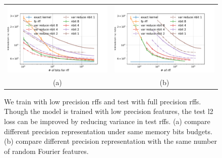 \begin{figure}
	\centering
	\begin{tabular}{c c}
		\includegraphics[width=.45\linewidth]{figures/valid_l2_var_reduction.pdf} &
		\includegraphics[width=.45\linewidth]{figures/valid_l2_n_fp_var_reduction.pdf} \\
		(a) & (b)
	\end{tabular}
	\caption{We train with low precision rffs and test with full precision rffs. Though the model is trained with low precision features, the test l2 loss can be improved by reducing variance in test rffs. (a) compare different precision representation under same memory bits budgets. (b) compare different precision representation with the same number of random Fourier features.}
	\label{fig:var_reduction}
\end{figure}


